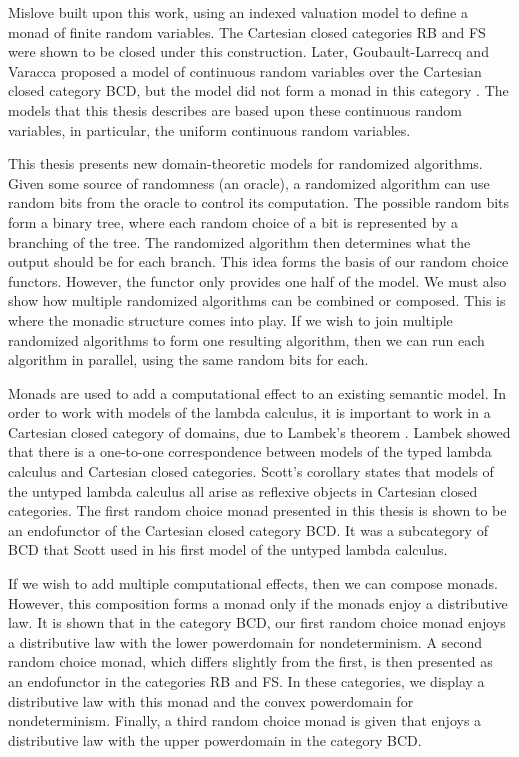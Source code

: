 Mislove \cite{mislove2007discrete} built upon this work, using an indexed valuation model to define a monad of finite random variables.  The Cartesian closed categories \textsf{RB} and \textsf{FS} were shown to be closed under this construction.  Later, Goubault-Larrecq and Varacca \cite{GLV-lics2011} proposed a model of continuous random variables over the Cartesian closed category \textsf{BCD}, but the model did not form a monad in this category \cite{mislove2013anatomy}.  The models that this thesis describes are based upon these continuous random variables, in particular, the uniform continuous random variables.  

This thesis presents new domain-theoretic models for randomized algorithms.  Given some source of randomness (an oracle), a randomized algorithm can use random bits from the oracle to control its computation.  The possible random bits form a binary tree, where each random choice of a bit is represented by a branching of the tree.  The randomized algorithm then determines what the output should be for each branch.  This idea forms the basis of our random choice functors.  However, the functor only provides one half of the model.  We must also show how multiple randomized algorithms can be combined or composed.  This is where the monadic structure comes into play.  If we wish to join multiple randomized algorithms to form one resulting algorithm, then we can run each algorithm in parallel, using the same random bits for each.

Monads are used to add a computational effect to an existing semantic model.  In order to work with models of the lambda calculus, it is important to work in a Cartesian closed category of domains, due to Lambek's theorem \cite{lambek1980lambda}.  Lambek showed that there is a one-to-one correspondence between models of the typed lambda calculus and Cartesian closed categories.  Scott's corollary \cite{scott1980relating} states that models of the untyped lambda calculus all arise as reflexive objects in Cartesian closed categories.  The first random choice monad presented in this thesis is shown to be an endofunctor of the Cartesian closed category \textsf{BCD}.  It was a subcategory of \textsf{BCD} that Scott used in his first model of the untyped lambda calculus.  

If we wish to add multiple computational effects, then we can compose monads.  However, this composition forms a monad only if the monads enjoy a distributive law.  It is shown that in the category \textsf{BCD}, our first random choice monad enjoys a distributive law with the lower powerdomain for nondeterminism.
A second random choice monad, which differs slightly from the first, is then presented as an endofunctor in the categories \textsf{RB} and \textsf{FS}.  In these categories, we display a distributive law with this monad and the convex powerdomain for nondeterminism.  Finally, a third random choice monad is given that enjoys a distributive law with the upper powerdomain in the category \textsf{BCD}.

